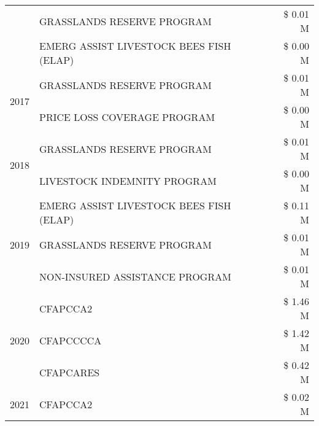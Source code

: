 \begin{tabular}{llr}
 & GRASSLANDS RESERVE PROGRAM & \$ 0.01 M \\
 & EMERG ASSIST LIVESTOCK BEES FISH (ELAP) & \$ 0.00 M \\
\cline{1-3}
\multirow[t]{2}{*}{2017} & GRASSLANDS RESERVE PROGRAM & \$ 0.01 M \\
 & PRICE LOSS COVERAGE PROGRAM & \$ 0.00 M \\
\cline{1-3}
\multirow[t]{2}{*}{2018} & GRASSLANDS RESERVE PROGRAM & \$ 0.01 M \\
 & LIVESTOCK INDEMNITY PROGRAM & \$ 0.00 M \\
\cline{1-3}
\multirow[t]{3}{*}{2019} & EMERG ASSIST LIVESTOCK BEES FISH (ELAP) & \$ 0.11 M \\
 & GRASSLANDS RESERVE PROGRAM & \$ 0.01 M \\
 & NON-INSURED ASSISTANCE PROGRAM & \$ 0.01 M \\
\cline{1-3}
\multirow[t]{3}{*}{2020} & CFAPCCA2 & \$ 1.46 M \\
 & CFAPCCCCA & \$ 1.42 M \\
 & CFAPCARES & \$ 0.42 M \\
\cline{1-3}
2021 & CFAPCCA2 & \$ 0.02 M \\
\cline{1-3}
\bottomrule
\end{tabular}
